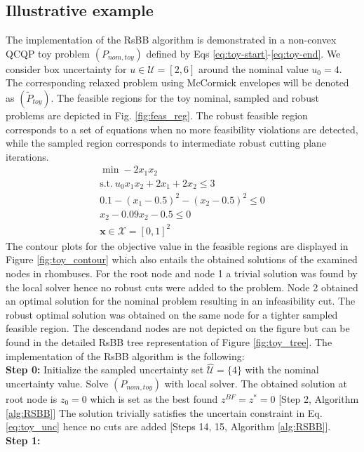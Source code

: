 \documentclass[sn-mathphys-num]{sn-jnl}
\begin{document}
\subsection{Illustrative example}
The implementation of the RsBB algorithm is demonstrated in a non-convex QCQP toy problem $(P_{nom,toy})$ defined by Eqs \eqref{eq:toy-start}-\eqref{eq:toy-end}. We consider box uncertainty for $u\in \mathcal{U}=[2,6]$ around the nominal value $u_0=4$. The corresponding relaxed problem using McCormick envelopes will be denoted as $(\tilde{P}_{toy})$. The feasible regions for the toy nominal, sampled and robust problems are depicted in Fig. \ref{fig:feas_reg}. The robust feasible region corresponds to a set of equations when no more feasibility violations are detected, while the sampled region corresponds to intermediate robust cutting plane iterations.
\begin{align}
        \min-2x_1x_2\label{eq:toy-start}\\
        \text{s.t.}~ u_0 x_1x_2+2x_1+2x_2\leq 3\label{eq:toy_unc}\\
        0.1 -(x_1-0.5)^2 -(x_2-0.5)^2\leq 0\\
        x_2-0.09x_2-0.5 \leq 0\\
        \textbf{x}\in \mathcal{X}=[0,1]^2\label{eq:toy-end}
\end{align}
The contour plots for the objective value in the feasible regions are displayed in Figure \ref{fig:toy_contour} which also entails the obtained solutions of the examined nodes in rhombuses. For the root node and node 1 a trivial solution was found by the local solver hence no robust cuts were added to the problem. Node 2 obtained an optimal solution for the nominal problem resulting in an infeasibility cut. The robust optimal solution was obtained on the same node for a tighter sampled feasible region. The descendand nodes are not depicted on the figure but can be found in  the detailed RsBB tree representation of Figure \ref{fig:toy_tree}. The implementation of the RsBB algorithm is the following:\\
\textbf{Step 0:}
Initialize the sampled uncertainty set $\hat{\mathcal{U}}=\{4\}$ with the nominal uncertainty value. Solve $(P_{nom,toy})$ with local solver. The obtained solution at root node is $z_0=0$ which is set as the best found $z^{BF}=z^*=0$ [Step 2, Algorithm \ref{alg:RSBB}]  The solution trivially satisfies the uncertain constraint in Eq.\eqref{eq:toy_unc} hence no cuts are added [Steps 14, 15, Algorithm \ref{alg:RSBB}].\\
\textbf{Step 1:}
\end{document}
